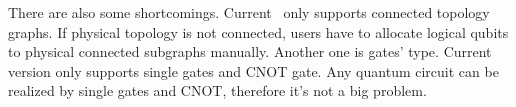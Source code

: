 There are also some shortcomings. Current \MindQuantum\ only supports connected topology graphs. If physical topology is not connected, users have to allocate logical qubits to physical connected subgraphs manually.
Another one is gates' type. Current version only supports single gates and CNOT gate. Any quantum circuit can be realized by single gates and CNOT, therefore it's not a big problem.

